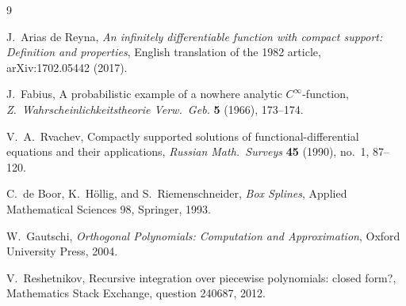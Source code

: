 \documentclass[11pt,oneside]{article}
\numberwithin{equation}{section}
\theoremstyle{definition}
\theoremstyle{remark}
\newcommand{\repo}{\textsc{ProveIt}}
\begin{document}
\begin{thebibliography}{9}

J.~Arias de Reyna,
\newblock \emph{An infinitely differentiable function with compact
support: Definition and properties}, English translation of the 1982
article, arXiv:1702.05442 (2017).

J.~Fabius,
\newblock A probabilistic example of a nowhere analytic
$C^\infty$-function,
\newblock \emph{Z.~Wahrscheinlichkeitstheorie Verw.~Geb.}
\textbf{5} (1966), 173--174.

V.~A.~Rvachev,
\newblock Compactly supported solutions of functional-differential
equations and their applications,
\newblock \emph{Russian Math.~Surveys} \textbf{45} (1990), no.~1,
87--120.

C.~de Boor, K.~H\"ollig, and S.~Riemenschneider,
\newblock \emph{Box Splines}, Applied Mathematical Sciences 98,
Springer, 1993.

W.~Gautschi,
\newblock \emph{Orthogonal Polynomials: Computation and
Approximation}, Oxford University Press, 2004.

V.~Reshetnikov,
\newblock Recursive integration over piecewise polynomials: closed
form?,
\newblock Mathematics Stack Exchange, question 240687, 2012.

\end{thebibliography}



\newcommand{\eps}{\varepsilon}
\newcommand{\KL}{\operatorname{D}}
\newcommand{\Ent}{\operatorname{h}}
\newcommand{\Fish}{\operatorname{I}}
\newcommand{\baseline}{\textcolor{linkblue}{\textsf{baseline}}}
\newcommand{\newresult}{\textcolor{deepgreen}{\textsf{proved here}}}
\newcommand{\conjstatus}{\textcolor{deepred}{\textsf{conjectural}}}
\renewcommand{\repo}{\nolinkurl{Analysis/FabiusFunction/docs}}
\newenvironment{proofidea}{\par\smallskip\noindent\textit{Proof architecture.}\ }{\hfill\(\square\)\par\smallskip}
\newenvironment{boxedremark}{%
  \par\smallskip\noindent\begin{center}\begin{minipage}{0.94\textwidth}%
  \color{black}\hrule\vspace{0.6em}\small
}{%
  \vspace{0.6em}\hrule\end{minipage}\end{center}\smallskip
}
\setcounter{section}{0}
\renewcommand{\thesection}{\arabic{section}}
\end{document}
